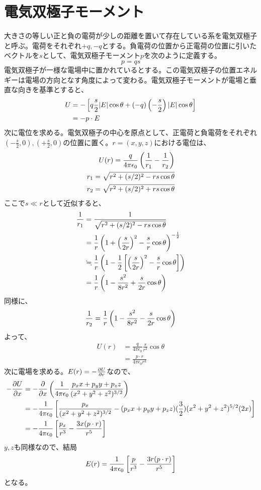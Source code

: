     \section{電気双極子モーメント}
        大きさの等しい正と負の電荷が少しの距離を置いて存在している系を電気双極子と呼ぶ。電荷をそれぞれ$+q,-q$とする。負電荷の位置から正電荷の位置に引いたベクトルを$s$として、電気双極子モーメント$p$を次のように定義する。
            \[p = qs\]
        電気双極子が一様な電場中に置かれているとする。この電気双極子の位置エネルギーは電場の方向となす角度によって変わる。電気双極子モーメントが電場と垂直な向きを基準とすると、
        \begin{align*}
            U &= -\llr{q\frac{s}{2}|E|\cos\theta +
            (-q)\lr{-\frac{s}{2}}|E|\cos\theta}\\
            &= -p\cdot E
        \end{align*}
        次に電位を求める。電気双極子の中心を原点として、正電荷と負電荷をそれぞれ$(-\frac{s}{2},0),(+\frac{s}{2},0)$の位置に置く。$r = (x,y,z)$における電位は、
        \begin{align*}
            U(r) = \frac{q}{4\pi\epsilon_0}\lr{\rec{r_1} - \rec{r_2}}\\
            r_1 = \sqrt{r^2 + (s/2)^2 - rs\cos\theta}\\
            r_2 = \sqrt{r^2 + (s/2)^2 + rs\cos\theta}
        \end{align*}
        ここで$s \ll r$として近似すると、
        \begin{align*}
            \rec{r_1} &= \rec{\sqrt{r^2 + (s/2)^2 - rs\cos\theta}}\\
            &= \rec{r}\lr{1 + \lr{\frac{s}{2r}}^2
                - \frac{s}{r}\cos\theta}^{-\rec{2}}\\
            &\fallingdotseq \rec{r}\lr{1 - \rec{2}
                \llr{\lr{\frac{s}{2r}}^2 - \frac{s}{r}\cos\theta}}\\
            &= \rec{r}\lr{1 - \frac{s^2}{8r^2} + \frac{s}{2r}\cos\theta}
        \end{align*}
        同様に、
            \[\rec{r_2} =\rec{r}
            \lr{1 - \frac{s^2}{8r^2} - \frac{s}{2r}\cos\theta}\]
        よって、
        \begin{align*}
            U(r) &= \frac{q}{4\pi\epsilon_0}\frac{s}{r^2}\cos\theta\\
            &= \frac{p\cdot r}{4\pi\epsilon_0r^3}
        \end{align*}
        次に電場を求める。$E(r) = -\pd[U]{r}$なので、
        \begin{align*}
            -\pd[U]{x} &= -\pd{x}\lr{\rec{4\pi\epsilon_0}\frac{p_x x + p_y y + p_z z}{(x^2+y^2+z^2)^{3/2}}}\\
            &= -\rec{4\pi\epsilon_0}\llr{\frac{p_x}{(x^2 + y^2 + z^2)^{3/2}} - (p_x x + p_y y + p_z z)(\frac{3}{2})(x^2 + y^2 + z^2)^{5/2}(2x)}\\
            &= -\rec{4\pi\epsilon_0}\llr{\frac{p_x}{r^3} - \frac{3x(p\cdot r)}{r^5}}
        \end{align*}
        $y,z$も同様なので、結局
            \[E(r) = \rec{4\pi\epsilon_0}\llr{\frac{p}{r^3} - \frac{3r(p\cdot r)}{r^5}}\]
        となる。
